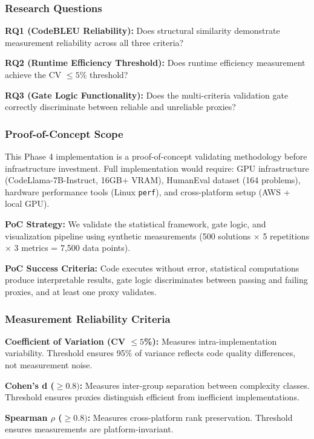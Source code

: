 
\subsubsection{Research Questions}

\textbf{RQ1 (CodeBLEU Reliability):} Does structural similarity demonstrate measurement reliability across all three criteria?

\textbf{RQ2 (Runtime Efficiency Threshold):} Does runtime efficiency measurement achieve the CV $\leq 5$\% threshold?

\textbf{RQ3 (Gate Logic Functionality):} Does the multi-criteria validation gate correctly discriminate between reliable and unreliable proxies?

\subsubsection{Proof-of-Concept Scope}

This Phase 4 implementation is a proof-of-concept validating methodology before infrastructure investment. Full implementation would require: GPU infrastructure (CodeLlama-7B-Instruct, 16GB+ VRAM), HumanEval dataset (164 problems), hardware performance tools (Linux \texttt{perf}), and cross-platform setup (AWS + local GPU).

\textbf{PoC Strategy:} We validate the statistical framework, gate logic, and visualization pipeline using synthetic measurements (500 solutions $\times$ 5 repetitions $\times$ 3 metrics = 7,500 data points).

\textbf{PoC Success Criteria:} Code executes without error, statistical computations produce interpretable results, gate logic discriminates between passing and failing proxies, and at least one proxy validates.

\subsubsection{Measurement Reliability Criteria}

\textbf{Coefficient of Variation (CV $\leq 5$\%):} Measures intra-implementation variability. Threshold ensures 95\% of variance reflects code quality differences, not measurement noise.

\textbf{Cohen's d ($\geq 0.8)$:} Measures inter-group separation between complexity classes. Threshold ensures proxies distinguish efficient from inefficient implementations.

\textbf{Spearman $\rho$ ($\geq 0.8)$:} Measures cross-platform rank preservation. Threshold ensures measurements are platform-invariant.
